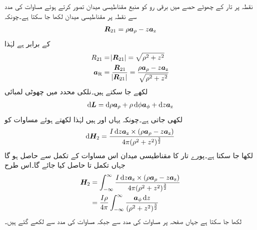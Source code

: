 نقطہ  پر تار کے چھوٹے حصے  میں برقی رو کو منبع مقناطیسی میدان تصور کرتے ہوئے مساوات  کی مدد سے نقطہ  پر مقناطیسی میدان لکھا جا سکتا ہے۔چونکہ 
\begin{align*}
{\ensuremath{{\boldsymbol{R}}}}_{21}=\rho {\boldsymbol{a}}_{\rho}-z {\boldsymbol{a}}_{\textup{z}}
\end{align*}
کے برابر ہے لہٰذا
\begin{align*}
R_{21}&=\abs{{{\boldsymbol{R}}}_{21}}=\sqrt{\rho^2+z^2}\\
{\boldsymbol{a}}_{\textup{R}}&=\frac{{{\boldsymbol{R}}}_{21}}{\abs{{{\boldsymbol{R}}}_{21}}}=\frac{\rho {\boldsymbol{a}}_{\rho}-z {\boldsymbol{a}}_{\textup{z}}}{\sqrt{\rho^2+z^2}}
\end{align*}
لکھے جا سکتے ہیں۔نلکی محدد میں چھوٹی لمبائی
\begin{align*}
\dif \kvec{L}=\dif \rho \arho+\rho \dif \phi \aphi+\dif z \az
\end{align*}
لکھی جاتی ہے۔چونکہ یہاں  اور  ہیں لہٰذا  لکھتے ہوئے  مساوات  کو
\begin{align*}
\dif \kvec{H}_2=\frac{I \dif z \az \times (\rho \arho -z\az)}{4 \pi (\rho^2+z^2)^{\frac{3}{2}}}
\end{align*}
لکھا جا سکتا ہے۔پورے تار کا مقناطیسی میدان اس مساوات کے تکمل سے حاصل ہو گا جہاں تکمل تا  حاصل کیا جائے گا۔اس طرح
\begin{align*}
\kvec{H}_2&=\int_{-\infty}^{\infty}\frac{I \dif z \az \times (\rho \arho -z\az)}{4 \pi (\rho^2+z^2)^{\frac{3}{2}}}\\
&=\frac{I \rho}{4\pi}\int_{-\infty}^{\infty} \frac{\aphi \dif z }{(\rho^2+z^2)^{\frac{3}{2}}}
\end{align*}    
لکھا جا سکتا ہے جہاں صفحہ  پر مساوات  کی مدد سے  جبکہ مساوات  کی مدد سے  لکھے گئے ہیں۔

